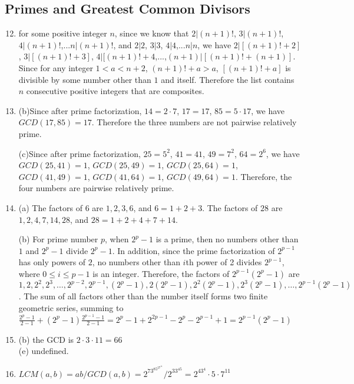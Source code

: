 \documentclass{article}
\begin{document}
\subsection{Primes and Greatest Common Divisors}
\begin{enumerate}
    \setcounter{enumi}{11}
    \item for some positive integer $n$, since we know that $2|(n+1)!$, $3|(n+1)!$, $4|(n+1)!$,...$n|(n+1)!$, and $2|2$, $3|3$, $4|4$,...$n|n$, we have $2|[(n+1)!+2]$, $3|[(n+1)!+3]$, $4|[(n+1)!+4$,...,$(n+1)|[(n+1)!+(n+1)]$. Since for any integer $1<a<n+2$, $(n+1)!+a > a$, $[(n+1)!+a]$ is divisible by some number other than $1$ and itself. Therefore the list contains $n$ consecutive positive integers that are composites.
    
    \setcounter{enumi}{15}
    \item (b)Since after prime factorization, $14 = 2\cdot7$, $17 = 17$, $85 = 5\cdot 17$, we have $GCD(17,85) = 17$. Therefore the three numbers are not pairwise relatively prime.
    
    (c)Since after prime factorization, $25 = 5^2$, $41 = 41$, $49 = 7^2$, $64 = 2^6$, we have $GCD(25,41) = 1$, $GCD(25,49) = 1$, $GCD(25,64) = 1$, $GCD(41,49) = 1$, $GCD(41,64) = 1$, $GCD(49,64) = 1$. Therefore, the four numbers are pairwise relatively prime.
    
    \setcounter{enumi}{17}
    \item (a) The factors of $6$ are $1,2,3,6$, and $6 = 1+2+3$. The factors of $28$ are $1,2,4,7,14,28$, and $28 = 1+2+4+7+14$.
    
    (b) For prime number $p$, when $2^p-1$ is a prime, then no numbers other than $1$ and $2^p-1$ divide $2^p-1$. In addition, since the prime factorization of $2^{p-1}$ has only powers of $2$, no numbers other than $i$th power of 2 divides $2^{p-1}$, where $0 \leq i \leq p-1$ is an integer. Therefore, the factors of $2^{p-1}(2^p-1)$ are $1,2,2^2,2^3,\dots,2^{p-2},2^{p-1},(2^p-1),2(2^p-1),2^2(2^p-1),2^3(2^p-1),\dots,2^{p-1}(2^p-1)$. The sum of all factors other than the number itself forms two finite geometric series, summing to $\frac{2^p-1}{2-1}+(2^p-1)\frac{2^{p-1}-1}{2-1} = 2^p-1+2^{2p-1}-2^p-2^{p-1}+1 = 2^{p-1}(2^p-1)$
    
    \setcounter{enumi}{23}
    \item (b) the GCD is $2\cdot3\cdot11=66$\\
    (e) undefined.
    
    \setcounter{enumi}{29}
    \item $LCM(a,b) = ab/GCD(a,b) = 2^73^85^27^{11}/2^33^45=2^43^4\cdot5\cdot7^{11}$ 
    

\end{enumerate}
\end{document}
